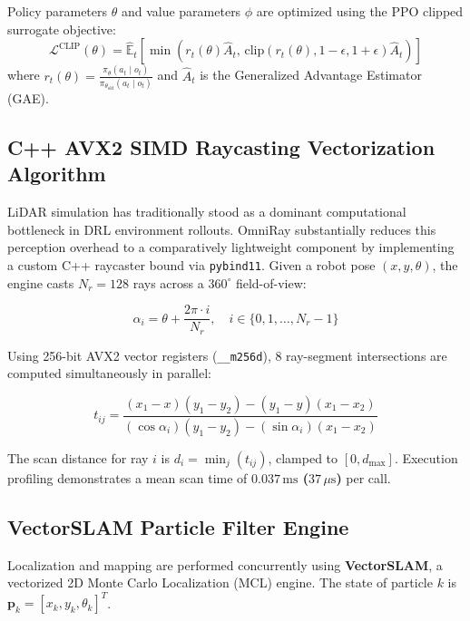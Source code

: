 \documentclass[11pt,a4paper]{article}
\begin{document}
Policy parameters $\theta$ and value parameters $\phi$ are optimized using the PPO clipped surrogate objective:
\begin{equation}
    \mathcal{L}^{\text{CLIP}}(\theta) = \hat{\mathbb{E}}_t \left[ \min\left( r_t(\theta)\hat{A}_t, \, \text{clip}(r_t(\theta), 1-\epsilon, 1+\epsilon)\hat{A}_t \right) \right]
\end{equation}
where $r_t(\theta) = \frac{\pi_\theta(a_t \mid o_t)}{\pi_{\theta_{\text{old}}}(a_t \mid o_t)}$ and $\hat{A}_t$ is the Generalized Advantage Estimator (GAE).

\subsection{C++ AVX2 SIMD Raycasting Vectorization Algorithm}

LiDAR simulation has traditionally stood as a dominant computational bottleneck in DRL environment rollouts. OmniRay substantially reduces this perception overhead to a comparatively lightweight component by implementing a custom C++ raycaster bound via \texttt{pybind11}. Given a robot pose $(x, y, \theta)$, the engine casts $N_r = 128$ rays across a $360^\circ$ field-of-view:

\begin{equation}
\alpha_i = \theta + \frac{2\pi \cdot i}{N_r}, \quad i \in \{0, 1, \dots, N_r-1\}
\end{equation}

Using 256-bit AVX2 vector registers (\texttt{\_\_m256d}), 8 ray-segment intersections are computed simultaneously in parallel:

\begin{equation}
t_{ij} = \frac{(x_1 - x)(y_1 - y_2) - (y_1 - y)(x_1 - x_2)}{(\cos \alpha_i)(y_1 - y_2) - (\sin \alpha_i)(x_1 - x_2)}
\end{equation}

The scan distance for ray $i$ is $d_i = \min_j (t_{ij})$, clamped to $[0, d_{\max}]$. Execution profiling demonstrates a mean scan time of \textbf{$0.037\,\text{ms}$ ($37\,\mu\text{s}$)} per call.

\subsection{VectorSLAM Particle Filter Engine}

Localization and mapping are performed concurrently using \textbf{VectorSLAM}, a vectorized 2D Monte Carlo Localization (MCL) engine. The state of particle $k$ is $\mathbf{p}_k = [x_k, y_k, \theta_k]^T$.
\end{document}
